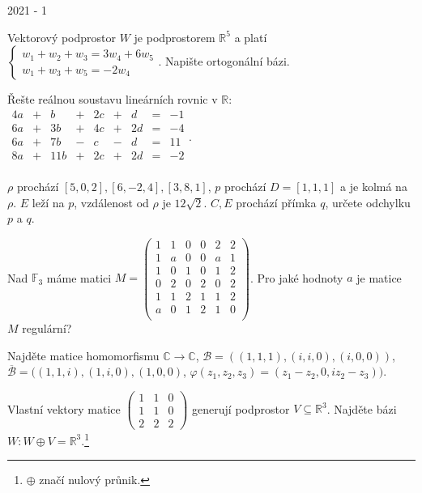 
\newpage
{\large 2021 - 1}

\begin{questions}

\question Vektorový podprostor \(W\) je podprostorem \(\mathbb{R}^5\) a platí \(\left\{
    \begin{array}{l}
        w_1 + w_2 + w_3 = 3w_4 + 6w_5\\
        w_1 + w_3 + w_5 = -2w_4
    \end{array}
\right.\). Napište ortogonální bázi.

\question Řešte reálnou soustavu lineárních rovnic v \(\mathbb{R}\): \(\begin{matrix}
    4a & + &   b & + & 2c & + &  d & = & -1\\
    6a & + &  3b & + & 4c & + & 2d & = & -4\\
    6a & + &  7b & - &  c & - &  d & = & 11\\
    8a & + & 11b & + & 2c & + & 2d & = & -2\\
\end{matrix}\).

\newpage
\question \(\rho\) prochází \([5,0,2], [6,-2,4], [3,8,1]\), \(p\) prochází \(D=[1,1,1]\) a je kolmá na \(\rho\). \(E\) leží na \(p\), vzdálenost od \(\rho\) je \(12\sqrt{2}\). \(C, E\) prochází přímka \(q\), určete odchylku \(p\) a \(q\).

\question Nad \(\mathbb{F}_3\) máme matici \(M = \begin{pmatrix}
    1 & 1 & 0 & 0 & 2 & 2\\
    1 & a & 0 & 0 & a & 1\\
    1 & 0 & 1 & 0 & 1 & 2\\
    0 & 2 & 0 & 2 & 0 & 2\\
    1 & 1 & 2 & 1 & 1 & 2\\
    a & 0 & 1 & 2 & 1 & 0\\
\end{pmatrix}\). Pro jaké hodnoty \(a\) je matice \(M\) regulární?

\newpage
\question Najděte matice homomorfismu \(\mathbb{C} \rightarrow \mathbb{C}\), \(\mathcal{B} = ((1,1,1),(i,i,0),(i,0,0))\), \(\overline{\mathcal{B}} = ((1,1,i), (1,i,0), (1,0,0)\), \(\varphi(z_1, z_2, z_3) = (z_1-z_2, 0, iz_2-z_3))\).

\question Vlastní vektory matice \(\begin{pmatrix}
    1 & 1 & 0\\
    1 & 1 & 0\\
    2 & 2 & 2
\end{pmatrix}\) generují podprostor \(V \subseteq \mathbb{R}^3\). Najděte bázi \(W: W \oplus V = \mathbb{R}^3\).\footnote{\(\oplus\) značí nulový průnik.}

\end{questions}


